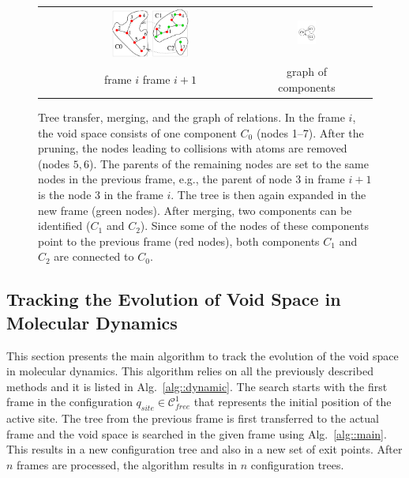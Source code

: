 \documentclass[usletter, 10pt, conference]{svjour3}      %
\def\qinit{q_{site}}
\def\CF{\mathcal{C}_{free}}
\begin{document}
\begin{figure}
{\begin{tabular}{cccccc}
& \multicolumn{3}{c}{\includegraphics[width=0.4\textwidth]{fig/rrtdyn8}} & \includegraphics[width=0.19\textwidth]{fig/rrtdyn9} \\
&  \multicolumn{3}{c}{ frame $i$ \hskip 28pt frame $i+1$ } & graph of components
\end{tabular}
}
\caption{\label{fig::transfer}
Tree transfer, merging, and the graph of relations.
In the frame $i$, the void space consists of one component $C_0$ (nodes 1--7).
After the pruning, the nodes leading to collisions with atoms are removed (nodes $5,6$).
The parents of the remaining nodes are set to the same nodes in the previous frame, e.g., the parent of node 3 in frame $i+1$ is the node 3 in the frame $i$.
The tree is then again expanded in the new frame (green nodes).
After merging, two components can be identified ($C_1$ and $C_2$). 
Since some of the nodes of these components point to the previous frame (red nodes), both components $C_1$ and $C_2$ are connected to $C_0$.
}
\end{figure}





\subsection{Tracking the Evolution of Void Space in Molecular Dynamics}

This section presents the main algorithm to track the evolution of the void space in molecular dynamics.
This algorithm relies on all the previously described methods and it is listed in Alg.~\ref{alg::dynamic}.
The search starts with the first frame in the configuration $\qinit \in \CF^1$ that represents the initial position of the active site.
The tree from the previous frame is first transferred to the actual frame and the void space is searched in the given frame using Alg.~\ref{alg::main}.
This results in a new configuration tree and also in a new set of exit points.
After $n$ frames are processed, the algorithm results in $n$ configuration trees.
\end{document}
